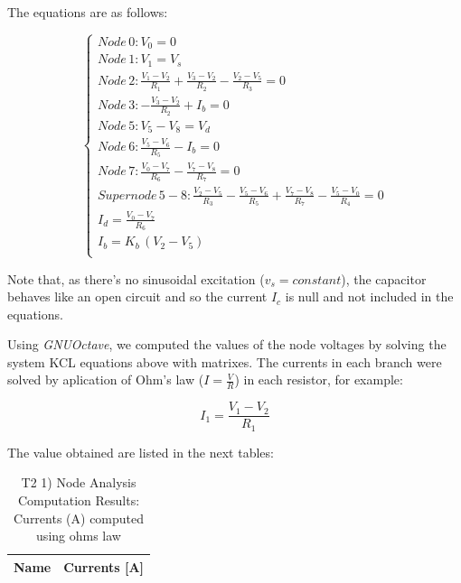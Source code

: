 The equations are as follows:

\begin{equation} 
\begin{cases}

    Node\, 0: V_0 = 0 \\
    Node\, 1: V_1 = V_s \\
    Node\, 2: \frac{V_1 - V_2}{R_1} + \frac{V_3 - V_2}{R_2} - \frac{V_2 - V_5}{R_3} = 0 \\
    Node\, 3: -\frac{V_3 - V_2}{R_2} + I_b = 0 \\
    Node\, 5: V_5 - V_8 = V_d \\
    Node\, 6: \frac{V_5 - V_6}{R_5} - I_b = 0 \\
    Node\, 7: \frac{V_0 - V_7}{R_6} - \frac{V_7 - V_8}{R_7} = 0 \\
    Supernode\, 5-8: \frac{V_2 - V_5}{R_3} - \frac{V_5 - V_6}{R_5} + \frac{V_7 - V_8}{R_7} - \frac{V_5 - V_0}{R_4} = 0 \\
    I_d = \frac{V_0 - V_7}{R_6} \\
    I_b = K_b\,(V_2 - V_5) \\
    
\end{cases}
\label{eq:1}
\end{equation}


Note that, as there's no sinusoidal excitation ($v_s = constant$), the capacitor behaves like an open circuit and so the current $I_c$ is null and not included in the equations.


Using \textit{GNUOctave}, we computed the values of the node voltages by solving the system KCL equations above with matrixes. The currents in each branch were solved by aplication of Ohm's law ($I = \frac{V}{R}$) in each resistor, for example:

\begin{center}
  \begin{equation}
    I_1 = \frac{V_1 - V_2}{R_1}
  \end{equation} 
\end{center}


The value obtained are listed in the next tables:

\begin{table}[ht]
  \centering
  \begin{tabular}{|l|r|}
    \hline    
    {\bf Name} & {\bf Currents [A]} \\ \hline
    
  \end{tabular}
  \caption{T2 1) Node Analysis Computation Results: Currents (A) computed using ohms law}
  \label{tab:nodeCurrents1}
\end{table}

